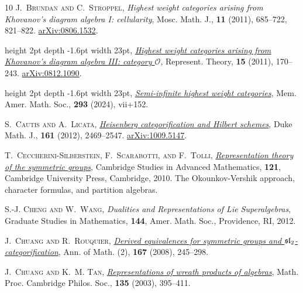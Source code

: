 \documentclass[a4paper,11pt]{amsart}
\numberwithin{equation}{subsection}
\theoremstyle{definition}
\theoremstyle{theorem}
\theoremstyle{remark}
\begin{document}
\begin{thebibliography}{10}
\textsc{J.~Brundan and C.~Stroppel}, \textit{Highest weight categories arising
  from {K}hovanov's diagram algebra {I}: cellularity}, Mosc. Math. J.,
  \textbf{11} (2011), 685--722, 821--822.
\newblock \href{http://arxiv.org/abs/0806.1532}{arXiv:0806.1532}.

\leavevmode\vrule height 2pt depth -1.6pt width 23pt,
  \href{http://dx.doi.org/10.1090/S1088-4165-2011-00389-7}{\textit{Highest
  weight categories arising from {K}hovanov's diagram algebra {III}: category
  {$\mathcal O$}}}, Represent. Theory, \textbf{15} (2011), 170--243.
\newblock \href{http://arxiv.org/abs/0812.1090}{arXiv:0812.1090}.

\leavevmode\vrule height 2pt depth -1.6pt width 23pt,
  \href{http://dx.doi.org/10.1090/memo/1459}{\textit{Semi-infinite highest
  weight categories}}, Mem. Amer. Math. Soc., \textbf{293} (2024), vii+152.

\textsc{S.~Cautis and A.~Licata},
  \href{http://dx.doi.org/10.1215/00127094-1812726}{\textit{Heisenberg
  categorification and {H}ilbert schemes}}, Duke Math. J., \textbf{161} (2012),
  2469--2547.
\newblock \href{http://arxiv.org/abs/1009.5147}{arXiv:1009.5147}.

\textsc{T.~Ceccherini-Silberstein, F.~Scarabotti, and F.~Tolli},
  \href{http://dx.doi.org/10.1017/CBO9781139192361}{\textit{Representation
  theory of the symmetric groups}}, Cambridge Studies in Advanced Mathematics,
  \textbf{121}, Cambridge University Press, Cambridge, 2010.
\newblock The Okounkov-Vershik approach, character formulas, and partition
  algebras.

\textsc{S.-J. Cheng and W.~Wang}, \textit{Dualities and Representations of
  {L}ie Superalgebras}, Graduate Studies in Mathematics, \textbf{144}, Amer.
  Math. Soc., Providence, RI, 2012.

\textsc{J.~Chuang and R.~Rouquier},
  \href{http://dx.doi.org/10.4007/annals.2008.167.245}{\textit{Derived
  equivalences for symmetric groups and {$\mathfrak {sl}\sb
  2$}-categorification}}, Ann. of Math. (2), \textbf{167} (2008), 245--298.

\textsc{J.~Chuang and K.~M. Tan},
  \href{http://dx.doi.org/10.1017/S0305004103006984}{\textit{Representations of
  wreath products of algebras}}, Math. Proc. Cambridge Philos. Soc.,
  \textbf{135} (2003), 395--411.


\end{thebibliography}
\end{document}
